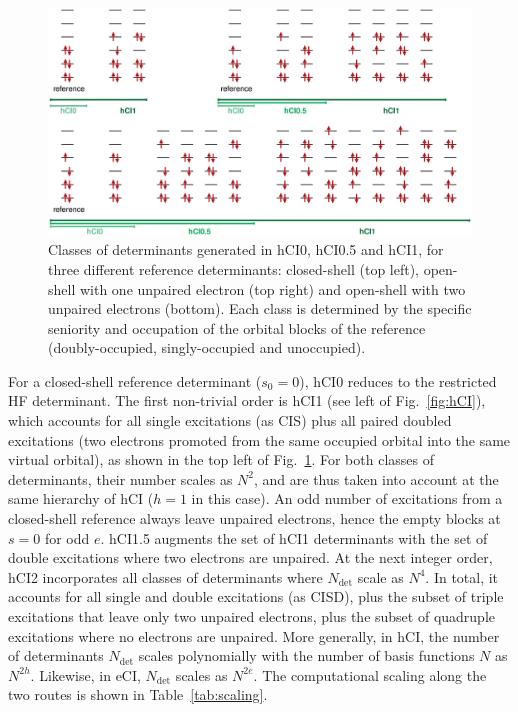 \documentclass[aip,jcp,reprint,noshowkeys,superscriptaddress]{revtex4-1}
\newcommand{\Ndet}{N_\text{det}}
\begin{document}
\begin{figure}%
\includegraphics[width=1.0\linewidth]{determinants}
\caption{Classes of determinants generated in hCI0, hCI0.5 and hCI1, for three different reference determinants:
closed-shell (top left), open-shell with one unpaired electron (top right) and open-shell with two unpaired electrons (bottom).
Each class is determined by the specific seniority and occupation of the orbital blocks of the reference (doubly-occupied, singly-occupied and unoccupied).}
\label{fig:determinants}
\end{figure}


For a closed-shell reference determinant ($s_0=0$), hCI0 reduces to the restricted HF determinant.
The first non-trivial order is hCI1 (see left of Fig.~\ref{fig:hCI}), which accounts for all single excitations (as CIS)
plus all paired doubled excitations (two electrons promoted from the same occupied orbital into the same virtual orbital),
as shown in the top left of Fig.~\ref{fig:determinants}.
For both classes of determinants, their number scales as $N^2$, and are thus taken into account at the same hierarchy of hCI ($h=1$ in this case).
An odd number of excitations from a closed-shell reference always leave unpaired electrons, hence the empty blocks at $s=0$ for odd $e$.
hCI1.5 augments the set of hCI1 determinants with the set of double excitations where two electrons are unpaired.
At the next integer order, hCI2 incorporates all classes of determinants where $\Ndet$ scale as $N^4$.
In total, it accounts for all single and double excitations (as CISD), plus the subset of triple excitations that leave only two unpaired electrons,
plus the subset of quadruple excitations where no electrons are unpaired.
More generally, in hCI, the number of determinants $\Ndet$ scales polynomially with the number of basis functions $N$ as $N^{2h}$.
Likewise, in eCI, $\Ndet$ scales as $N^{2e}$.
The computational scaling along the two routes is shown in Table~\ref{tab:scaling}.
\end{document}
